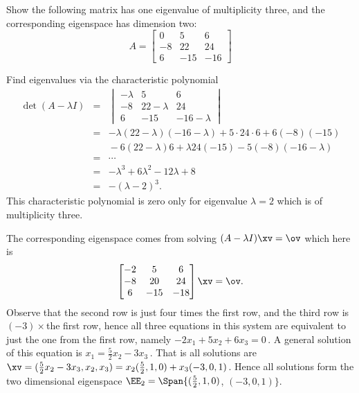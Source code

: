 \begin{example} \label{eg:}
Show the following matrix has one eigenvalue of multiplicity three, and the corresponding eigenspace has dimension two:
\begin{equation*}
A=\begin{bmatrix}0&5&6
\\-8&22&24
\\6&-15&-16 \end{bmatrix}
\end{equation*}
\begin{solution} 
Find eigenvalues via the characteristic polynomial
\begin{eqnarray*}
\det(A-\lambda I)
&=&
\begin{vmatrix} -\lambda&5&6
\\-8&22-\lambda&24
\\6&-15&-16-\lambda \end{vmatrix}
\\&=&-\lambda(22-\lambda)(-16-\lambda)+5\cdot24\cdot6+6(-8)(-15)
\\&&{}-6(22-\lambda)6+\lambda24(-15)-5(-8)(-16-\lambda)
\\&=&\cdots
\\&=&-\lambda^3+6\lambda^2-12\lambda+8
\\&=&-(\lambda-2)^3.
\end{eqnarray*}
This characteristic polynomial is zero only for eigenvalue \(\lambda=2\) which is of multiplicity three.

The corresponding eigenspace comes from solving \((A-\lambda I)\xv=\ov\) which here is
\begin{equation*}
\begin{bmatrix}-2&5&6
\\-8&20&24
\\6&-15&-18 \end{bmatrix}\xv=\ov.
\end{equation*}
Observe that the second row is just four times the first row, and the third row is \((-3)\times{}\)the first row, hence all three equations in this system are equivalent to just the one from the first row, namely \(-2x_1+5x_2+6x_3=0\)\,.
A general solution of this equation is \(x_1=\tfrac52x_2-3x_3\)\,.
That is all solutions are \(\xv=(\tfrac52x_2-3x_3,x_2,x_3)=x_2(\tfrac52,1,0)+x_3(-3,0,1)\). 
Hence all solutions form the two dimensional eigenspace 
\(\EE_2=\Span\{(\tfrac52,1,0)\), \((-3,0,1)\}\).
\end{solution}
\end{example}



